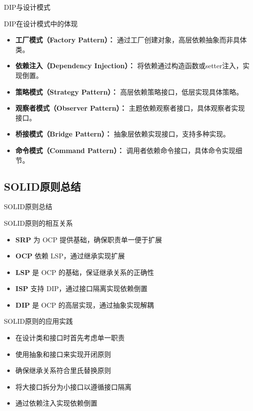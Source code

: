 \documentclass[UTF8,aspectratio=169]{beamer}
\begin{document}
\begin{frame}{DIP与设计模式}
    \begin{ytublock}{DIP在设计模式中的体现}
        \begin{itemize}
            \item \textbf{工厂模式（Factory Pattern）：} 通过工厂创建对象，高层依赖抽象而非具体类。
            \item \textbf{依赖注入（Dependency Injection）：} 将依赖通过构造函数或setter注入，实现倒置。
            \item \textbf{策略模式（Strategy Pattern）：} 高层依赖策略接口，低层实现具体策略。
            \item \textbf{观察者模式（Observer Pattern）：} 主题依赖观察者接口，具体观察者实现接口。
            \item \textbf{桥接模式（Bridge Pattern）：} 抽象层依赖实现接口，支持多种实现。
            \item \textbf{命令模式（Command Pattern）：} 调用者依赖命令接口，具体命令实现细节。
        \end{itemize}
    \end{ytublock}
\end{frame}

\subsection{SOLID原则总结}

\begin{frame}{SOLID原则总结}
    \begin{ytublock}{SOLID原则的相互关系}
        \begin{itemize}
            \item \textbf{SRP} 为 OCP 提供基础，确保职责单一便于扩展
            \item \textbf{OCP} 依赖 LSP，通过继承实现扩展
            \item \textbf{LSP} 是 OCP 的基础，保证继承关系的正确性
            \item \textbf{ISP} 支持 DIP，通过接口隔离实现依赖倒置
            \item \textbf{DIP} 是 OCP 的高层实现，通过抽象实现解耦
        \end{itemize}
    \end{ytublock}

    \begin{exampleytublock}{SOLID原则的应用实践}
        \begin{itemize}
            \item 在设计类和接口时首先考虑单一职责
            \item 使用抽象和接口来实现开闭原则
            \item 确保继承关系符合里氏替换原则
            \item 将大接口拆分为小接口以遵循接口隔离
            \item 通过依赖注入实现依赖倒置
        \end{itemize}
    \end{exampleytublock}
\end{frame}
\end{document}
